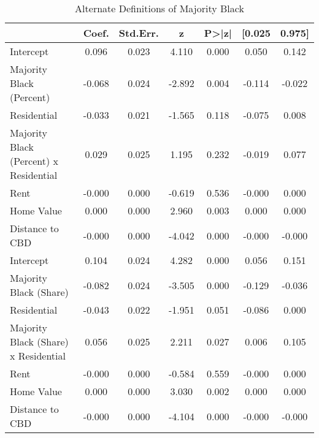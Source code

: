 \begin{table}[h]
\centering
\caption{Alternate Definitions of Majority Black}
\label{tab:second_results}
\begin{tabular}{lcccccc}
\toprule
 & Coef. & Std.Err. & z & P>|z| & [0.025 & 0.975] \\
\midrule
Intercept & 0.096 & 0.023 & 4.110 & 0.000 & 0.050 & 0.142 \\
Majority Black (Percent) & -0.068 & 0.024 & -2.892 & 0.004 & -0.114 & -0.022 \\
Residential & -0.033 & 0.021 & -1.565 & 0.118 & -0.075 & 0.008 \\
Majority Black (Percent) x Residential & 0.029 & 0.025 & 1.195 & 0.232 & -0.019 & 0.077 \\
Rent & -0.000 & 0.000 & -0.619 & 0.536 & -0.000 & 0.000 \\
Home Value & 0.000 & 0.000 & 2.960 & 0.003 & 0.000 & 0.000 \\
Distance to CBD & -0.000 & 0.000 & -4.042 & 0.000 & -0.000 & -0.000 \\
Intercept & 0.104 & 0.024 & 4.282 & 0.000 & 0.056 & 0.151 \\
Majority Black (Share) & -0.082 & 0.024 & -3.505 & 0.000 & -0.129 & -0.036 \\
Residential & -0.043 & 0.022 & -1.951 & 0.051 & -0.086 & 0.000 \\
Majority Black (Share) x Residential & 0.056 & 0.025 & 2.211 & 0.027 & 0.006 & 0.105 \\
Rent & -0.000 & 0.000 & -0.584 & 0.559 & -0.000 & 0.000 \\
Home Value & 0.000 & 0.000 & 3.030 & 0.002 & 0.000 & 0.000 \\
Distance to CBD & -0.000 & 0.000 & -4.104 & 0.000 & -0.000 & -0.000 \\
\bottomrule
\end{tabular}
\end{table}
